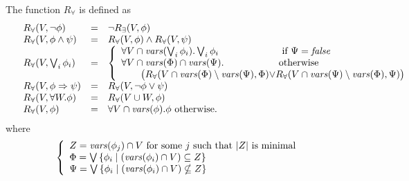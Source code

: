 \documentclass{article}
\newcommand{\vars}{\mathit{vars}}
\begin{document}
The function $R_{\forall}$ is defined as
\begin{equation*}
\begin{array}{lll}
R_{\forall}(V,\neg \phi) &=& \neg R_{\exists}(V,\phi)\\

R_{\forall}(V,\phi\wedge \psi)&=&R_{\forall}(V,\phi)\wedge R_{\forall}(V,\psi)\\

R_{\forall}(V, \bigvee_i \phi_i)&=&
   \left\{
     \begin{array}{ll}
       \forall V \cap \vars(\bigvee_i \phi_i). \bigvee_i \phi_i & \text{ if } \Psi = \mathit{false} \\

      \forall V \cap \vars(\Phi) \cap \vars(\Psi). & \text{otherwise}\\
      \qquad \big(
           R_\forall(V \cap \vars(\Phi) \setminus \vars(\Psi), \Phi) \mathrlap{\lor R_\forall(V \cap \vars(\Psi) \setminus \vars(\Phi), \Psi) \big)}
    \end{array}
     \right.
  \\


R_{\forall}(V,\phi\Rightarrow\psi)&=& R_{\forall}(V,\neg \phi \lor \psi) \\

R_{\forall}(V,\forall W.\phi)&=&R_{\forall}(V \cup W,\phi) \\

R_{\forall}(V,\phi)&=&\forall V\cap \vars(\phi).\phi\textrm{ otherwise}.
\end{array}
\end{equation*}
where
\[
     \left\{
       \begin{array}{l}
          Z = \vars(\phi_j) \cap V \text{ for some $j$ such that $|Z|$ is minimal} \\
          \Phi = \bigvee {\{ \phi_i \mid (\vars(\phi_i) \cap V) \subseteq Z \}} \\
          \Psi = \bigvee {\{ \phi_i \mid (\vars(\phi_i) \cap V) \nsubseteq Z \}}
       \end{array}
     \right. \\
\]
\end{document}

